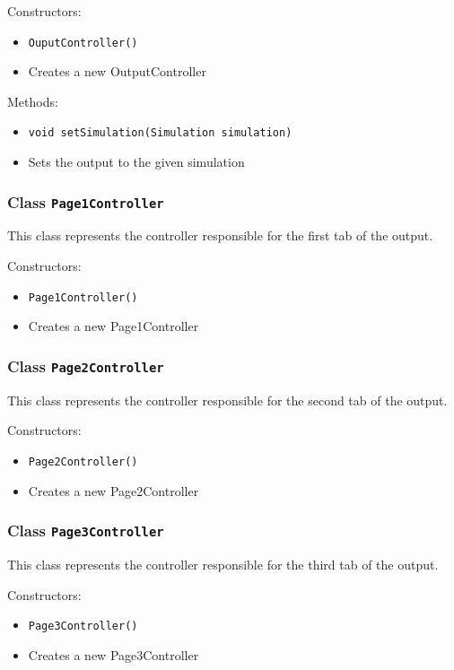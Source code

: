 \documentclass[parskip=full,11pt]{scrartcl}
\begin{document}
Constructors:
\begin{itemize}\itemsep -10pt
\item \texttt{OuputController()}
\item[] Creates a new OutputController
\end{itemize}

Methods:
\begin{itemize}\itemsep -10pt
\item \texttt{void setSimulation(Simulation simulation)}
\item[] Sets the output to the given simulation

\end{itemize}

\subsubsection{Class \texttt{Page1Controller}}
This class represents the controller responsible for the first tab of the output.

Constructors:
\begin{itemize}\itemsep -10pt
\item \texttt{Page1Controller()}
\item[] Creates a new Page1Controller
\end{itemize}

\subsubsection{Class \texttt{Page2Controller}}
This class represents the controller responsible for the second tab of the output.

Constructors:
\begin{itemize}\itemsep -10pt
\item \texttt{Page2Controller()}
\item[] Creates a new Page2Controller
\end{itemize}

\subsubsection{Class \texttt{Page3Controller}}
This class represents the controller responsible for the third tab of the output.

Constructors:
\begin{itemize}\itemsep -10pt
\item \texttt{Page3Controller()}
\item[] Creates a new Page3Controller
\end{itemize}
\end{document}
